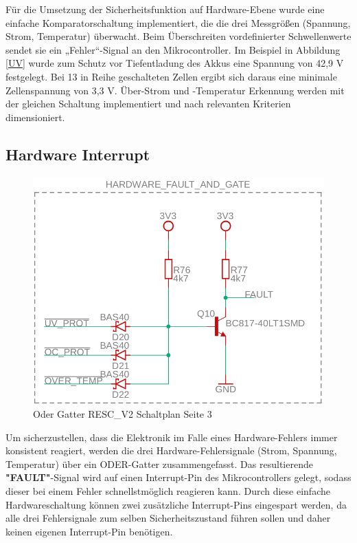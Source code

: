 \documentclass[paper=a4,11pt]{scrreprt}
\begin{document}
Für die Umsetzung der Sicherheitsfunktion auf Hardware-Ebene wurde eine einfache Komparatorschaltung implementiert, die die drei Messgrößen (Spannung, Strom, Temperatur) überwacht. Beim Überschreiten vordefinierter Schwellenwerte sendet sie ein „Fehler“-Signal an den Mikrocontroller.
Im Beispiel in Abbildung \ref{UV} wurde zum Schutz vor Tiefentladung des Akkus eine Spannung von 42,9 V festgelegt. Bei 13 in Reihe geschalteten Zellen ergibt sich daraus eine minimale Zellenspannung von 3,3 V.
Über-Strom und -Temperatur Erkennung werden mit der gleichen Schaltung implementiert und nach relevanten Kriterien dimensioniert.

\subsection{Hardware Interrupt}

\begin{figure}[ht]
\begin{center}
\includegraphics[width=12cm]{Bilder/FaultAnd.PNG}
\caption{Oder Gatter RESC\_V2 Schaltplan Seite 3}
\label{orGate}
\end{center}
\end{figure}

Um sicherzustellen, dass die Elektronik im Falle eines Hardware-Fehlers immer konsistent reagiert, werden die drei Hardware-Fehlersignale (Strom, Spannung, Temperatur) über ein ODER-Gatter zusammengefasst.
Das resultierende \textbf{"FAULT"}-Signal wird auf einen Interrupt-Pin des Mikrocontrollers gelegt, sodass dieser bei einem Fehler schnellstmöglich reagieren kann. Durch diese einfache Hardwareschaltung können zwei zusätzliche Interrupt-Pins eingespart werden, da alle drei Fehlersignale zum selben Sicherheitszustand führen sollen und daher keinen eigenen Interrupt-Pin benötigen.
\end{document}
